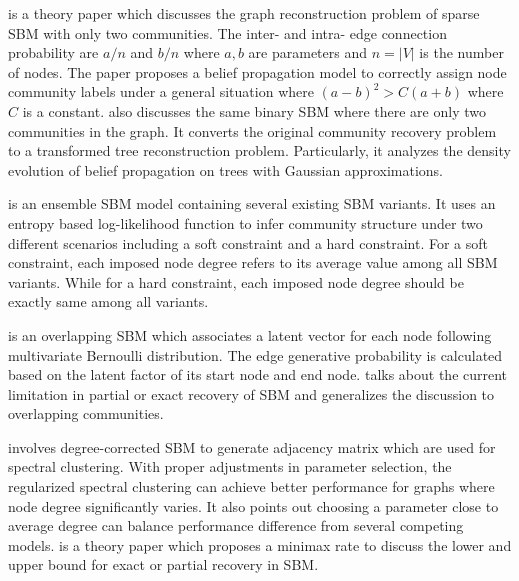 \cite{mossel2014belief} is a theory paper which discusses the graph reconstruction problem of sparse SBM with only two communities. The inter- and intra- edge connection probability are $a/n$ and $b/n$ where $a,b$ are parameters and $n = |V|$ is the number of nodes. The paper proposes a belief propagation model to correctly assign node community labels under a general situation where $(a-b)^2> C(a+b)$ where $C$ is a constant. \cite{mossel2016density} also discusses the same binary SBM where there are only two communities in the graph. It converts the original community recovery problem to a transformed tree reconstruction problem. Particularly, it analyzes the density evolution of belief propagation on trees with Gaussian approximations.

\cite{peixoto2012entropy} is an ensemble SBM model containing several existing SBM variants. It uses an entropy based log-likelihood function to infer community structure under two different scenarios including a soft constraint and a hard constraint. For a soft constraint, each imposed node degree refers to its average value among all SBM variants. While for a hard constraint, each imposed node degree should be exactly same among all variants.

\cite{latouche2011overlapping} is an overlapping SBM  which associates a latent vector for each node following multivariate Bernoulli distribution. The edge generative probability is calculated based on the latent factor of its start node and end node. \cite{abbe2015community} talks about the current limitation in partial or exact recovery of SBM and generalizes the discussion to overlapping communities.

\cite{qin2013regularized} involves degree-corrected SBM to generate adjacency matrix which are used for spectral clustering. With proper adjustments in parameter selection, the regularized spectral clustering can achieve better performance for graphs where node degree significantly varies. It also points out choosing a parameter close to average degree can balance performance difference from several competing models. \cite{zhang2016minimax} is a theory paper which proposes a minimax rate to discuss the lower and upper bound for exact or partial recovery in SBM.

